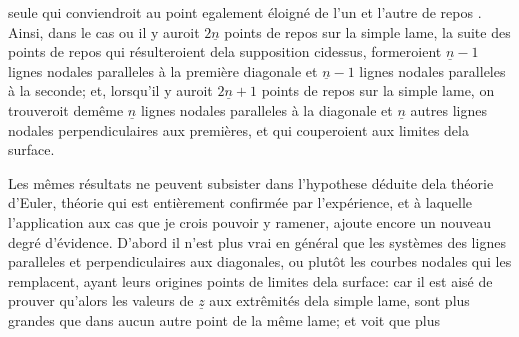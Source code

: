 \documentclass[11pt,a4paper]{article}
\begin{document}

seule qui conviendroit au point egalement éloigné de l'un et
l'autre   de repos  . Ainsi, dans le cas
ou il y auroit $2\underline{n}$ points de repos sur la simple lame,
la suite des points de repos qui résulteroient dela
supposition cidessus, formeroient $\underline{n}-1$ lignes nodales 
paralleles à la première diagonale et $\underline{n}-1$ lignes nodales
paralleles à la seconde; et, lorsqu'il y auroit $2\underline{n}+1$
points de repos sur la simple lame, on trouveroit
demême $\underline{n}$ lignes nodales paralleles à la diagonale et
$\underline{n}$ autres lignes nodales perpendiculaires aux premières,
et qui  couperoient  aux limites dela
surface.

Les mêmes résultats ne peuvent subsister dans l'hypothese
déduite dela théorie d'Euler, théorie qui est entièrement
confirmée par l'expérience, et à laquelle l'application
aux cas que je crois pouvoir y ramener, ajoute encore
un nouveau degré d'évidence. D'abord il n'est plus vrai
en général que les systèmes des lignes  paralleles et perpendiculaires
aux diagonales,  ou plutôt les courbes nodales
qui les remplacent, ayant leurs origines  points de
limites dela surface: car il est aisé de prouver qu'alors
les valeurs de $\underline{z}$ aux  extrêmités dela simple lame,
sont plus grandes que dans aucun autre point de
la même lame; et   voit que plus
\end{document}
